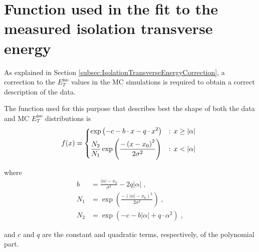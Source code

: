 \documentclass[12pt, twoside]{article}
\numberwithin{equation}{section}
\numberwithin{figure}{section}
\begin{document}
\newpage
\appendix

\thispagestyle{empty}
\section{Function used in the fit to the measured isolation transverse energy}
\label{appSec:IsolationTransverseEnergyFitFunction}
\vspace{1.0cm}

As explained in Section \ref{subsec:IsolationTransverseEnergyCorrection}, a correction to the $E^{\text{iso}}_{T}$ values in the MC simulations is required to obtain a correct description of the data.

The function used for this purpose that describes best the shape of both the data and MC $E^{\text{iso}}_{T}$ distributions is
\begin{equation}
    f(x) = \begin{dcases*}
         \exp{ \left( -c -b \cdot x -q \cdot x^{2} \right)} &: $x \geq \left| \alpha \right|$\\
         \frac{N_{2}}{N_{1}} \exp{ \left( \frac{-\left( x-x_{0} \right)^{2}}{2 \sigma^{2}} \right)} &: $x < \left| \alpha \right|$
 \end{dcases*}
\end{equation}

where
\begin{equation}
    \begin{aligned}
        b &= \frac{\left| \alpha \right| - x_{0}}{\sigma^{2}} - 2 q \left| \alpha \right| \; , \\
        N_{1} &= \exp{ \left( \frac{- \left( \left| \alpha \right| - x_{0} \right)^{2}}{2 \sigma^{2}} \right)} \; , \\
        N_{2} &= \exp{\left(-c -b \left| \alpha \right| +q \cdot \alpha^{2} \right)} \; ,
    \end{aligned}
\end{equation}

and $c$ and $q$ are the constant and quadratic terms, respectively, of the polynomial part.

\newpage
\thispagestyle{empty}
\end{document}
